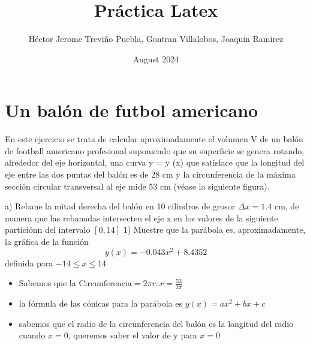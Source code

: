 \documentclass{article}
\title{Práctica Latex}
\author{Héctor Jerome Treviño Puebla, Gontran Villalobos, Joaquin Ramirez}
\date{August 2024}
\begin{document}
\section*{Un balón de futbol americano}
En este ejercicio se trata de calcular aproximadamente el volumen V de un balón
de football americano profesional suponiendo que su superficie se genera rotando,
alrededor del eje horizontal, una curva y = y (x) que satisface que la longitud del eje
entre las dos puntas del balón es de 28 cm y la circunferencia de la máxima sección
circular transversal al eje mide 53 cm (véase la siguiente figura).

a) Rebane la mitad derecha del balón en 10 cilindros de grosor $\Delta x = 1.4$ cm, de manera
que las rebanadas intersecten el eje x en los valores de la siguiente particiónn del intervalo
$[0, 14]$ 
1) Muestre que la parábola es, aproximadamente, la gráfica de la función
    $$y(x)=-0.043x^2 + 8.4352$$
definida para $-14\leq x\leq 14$


\begin{itemize}
    \item Sabemos que la $\text{Circunferencia}=2\pi r \therefore r=\frac{53}{2\pi}$
    \item la fórmula de las cónicas para la parábola es $y(x)=ax{^2}+bx+c$
    \item sabemos que el radio de la circunferencia del balón es la longitud del radio cuando $x=0$, queremos saber el valor de y para $x=0$
\end{itemize}
\end{document}
